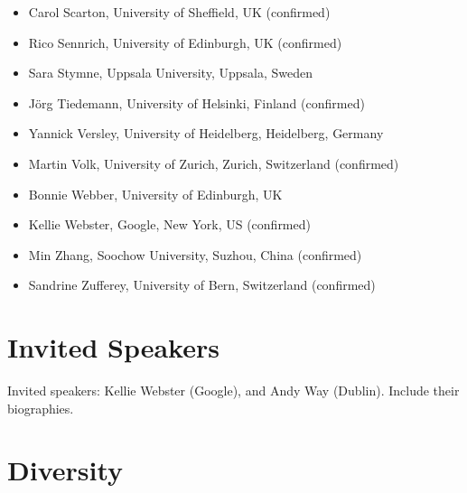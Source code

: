 \documentclass[11pt]{article}
\begin{document}
\begin{itemize}
\item Carol Scarton, University of Sheffield, UK (confirmed)
\item Rico Sennrich, University of Edinburgh, UK (confirmed)
\item Sara Stymne, Uppsala University, Uppsala, Sweden %
\item Jörg Tiedemann, University of Helsinki, Finland (confirmed)
\item Yannick Versley, University of Heidelberg, Heidelberg, Germany %
\item Martin Volk, University of Zurich, Zurich, Switzerland (confirmed)
\item Bonnie Webber, University of Edinburgh, UK
\item Kellie Webster, Google, New York, US (confirmed)
\item Min Zhang, Soochow University, Suzhou, China (confirmed)
\item Sandrine Zufferey, University of Bern, Switzerland (confirmed)
\end{itemize}


\section{Invited Speakers} %

Invited speakers: Kellie Webster (Google), and Andy Way (Dublin).  Include their biographies. %


\section{Diversity}

\end{document}
